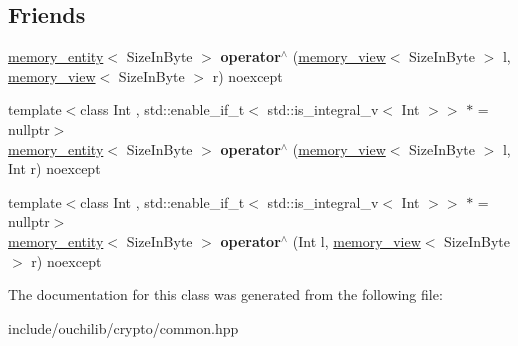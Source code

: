 \subsection*{Friends}
\begin{DoxyCompactItemize}
\item 
\mbox{\label{classouchi_1_1crypto_1_1memory__view_a6d41a4abd1db87421781a6a806ed87c9}} 
\mbox{\hyperlink{structouchi_1_1crypto_1_1memory__entity}{memory\+\_\+entity}}$<$ Size\+In\+Byte $>$ {\bfseries operator$^\wedge$} (\mbox{\hyperlink{classouchi_1_1crypto_1_1memory__view}{memory\+\_\+view}}$<$ Size\+In\+Byte $>$ l, \mbox{\hyperlink{classouchi_1_1crypto_1_1memory__view}{memory\+\_\+view}}$<$ Size\+In\+Byte $>$ r) noexcept
\item 
\mbox{\label{classouchi_1_1crypto_1_1memory__view_a277259b3645e77112edb8b22822a0718}} 
{\footnotesize template$<$class Int , std\+::enable\+\_\+if\+\_\+t$<$ std\+::is\+\_\+integral\+\_\+v$<$ Int $>$$>$ $\ast$  = nullptr$>$ }\\\mbox{\hyperlink{structouchi_1_1crypto_1_1memory__entity}{memory\+\_\+entity}}$<$ Size\+In\+Byte $>$ {\bfseries operator$^\wedge$} (\mbox{\hyperlink{classouchi_1_1crypto_1_1memory__view}{memory\+\_\+view}}$<$ Size\+In\+Byte $>$ l, Int r) noexcept
\item 
\mbox{\label{classouchi_1_1crypto_1_1memory__view_a578018b83509d55f77a8825a50aaed50}} 
{\footnotesize template$<$class Int , std\+::enable\+\_\+if\+\_\+t$<$ std\+::is\+\_\+integral\+\_\+v$<$ Int $>$$>$ $\ast$  = nullptr$>$ }\\\mbox{\hyperlink{structouchi_1_1crypto_1_1memory__entity}{memory\+\_\+entity}}$<$ Size\+In\+Byte $>$ {\bfseries operator$^\wedge$} (Int l, \mbox{\hyperlink{classouchi_1_1crypto_1_1memory__view}{memory\+\_\+view}}$<$ Size\+In\+Byte $>$ r) noexcept
\end{DoxyCompactItemize}


The documentation for this class was generated from the following file\+:\begin{DoxyCompactItemize}
\item 
include/ouchilib/crypto/common.\+hpp\end{DoxyCompactItemize}

